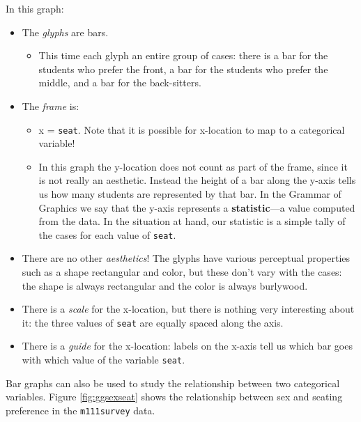 \documentclass[]{book}
\providecommand{\tightlist}{%
  \setlength{\itemsep}{0pt}\setlength{\parskip}{0pt}}
\theoremstyle{definition}
\theoremstyle{definition}
\theoremstyle{definition}
\theoremstyle{remark}
\begin{document}
{In this graph:

\begin{itemize}
\tightlist
\item
  The \emph{glyphs} are bars.

  \begin{itemize}
  \tightlist
  \item
    This time each glyph an entire group of cases: there is a bar for
    the students who prefer the front, a bar for the students who prefer
    the middle, and a bar for the back-sitters.
  \end{itemize}
\item
  The \emph{frame} is:

  \begin{itemize}
  \tightlist
  \item
    x = \texttt{seat}. Note that it is possible for x-location to map to
    a categorical variable!
  \item
    In this graph the y-location does not count as part of the frame,
    since it is not really an aesthetic. Instead the height of a bar
    along the y-axis tells us how many students are represented by that
    bar. In the Grammar of Graphics we say that the y-axis represents a
    \textbf{statistic}---a value computed from the data. In the
    situation at hand, our statistic is a simple tally of the cases for
    each value of \texttt{seat}.
  \end{itemize}
\item
  There are no other \emph{aesthetics}! The glyphs have various
  perceptual properties such as a shape rectangular and color, but these
  don't vary with the cases: the shape is always rectangular and the
  color is always burlywood.
\item
  There is a \emph{scale} for the x-location, but there is nothing very
  interesting about it: the three values of \texttt{seat} are equally
  spaced along the axis.
\item
  There is a \emph{guide} for the x-location: labels on the x-axis tell
  us which bar goes with which value of the variable \texttt{seat}.
\end{itemize}

Bar graphs can also be used to study the relationship between two
categorical variables. Figure \ref{fig:ggsexseat} shows the relationship
between sex and seating preference in the \texttt{m111survey} data.

\begin{figure}


\end{figure}}
\end{document}
